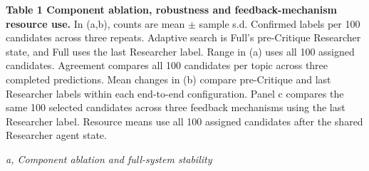 \clearpage
\begin{samepage}
\textbf{Table 1 \textbar{} Component ablation, robustness and feedback-mechanism resource use.} In (a,b), counts are mean $\pm$ sample s.d. Confirmed labels per 100 candidates across three repeats. Adaptive search is Full's pre-Critique Researcher state, and Full uses the last Researcher label. Range in (a) uses all 100 assigned candidates. Agreement compares all 100 candidates per topic across three completed predictions. Mean changes in (b) compare pre-Critique and last Researcher labels within each end-to-end configuration. Panel c compares the same 100 selected candidates across three feedback mechanisms using the last Researcher label. Resource means use all 100 assigned candidates after the shared Researcher agent state.

\begin{center}
\scriptsize
\setlength{\tabcolsep}{3.5pt}
\textit{a, Component ablation and full-system stability}\\[2pt]


\end{center}
\end{samepage}
